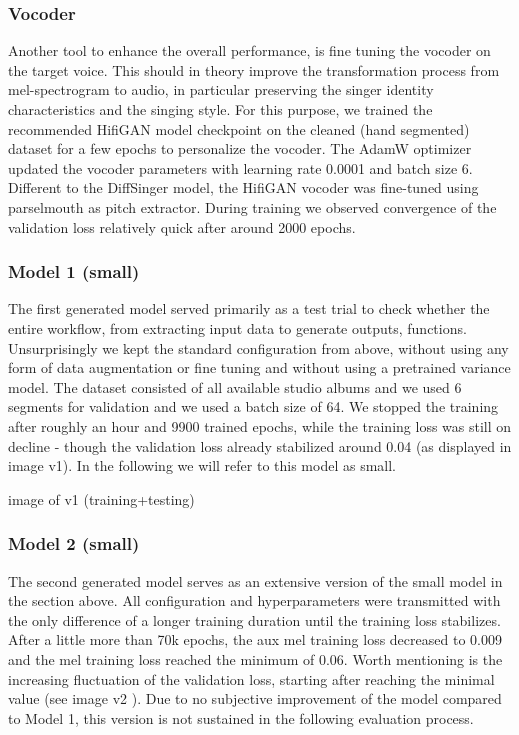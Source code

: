 \documentclass[a4paper]{article}
\begin{document}
	\subsubsection{Vocoder}
	
	Another tool to enhance the overall performance, is fine tuning the vocoder on the target voice. This should in theory improve the transformation process from mel-spectrogram to audio, in particular preserving the singer identity characteristics and the singing style. For this purpose, we trained the recommended HifiGAN model checkpoint on the cleaned (hand segmented) dataset for a few epochs to personalize the vocoder. The AdamW optimizer updated the vocoder parameters with learning rate 0.0001 and batch size 6. Different to the DiffSinger model, the HifiGAN vocoder was fine-tuned using parselmouth as pitch extractor. During training we observed convergence of the validation loss relatively quick after around 2000 epochs. 
	
	\subsubsection{Model 1 (small)}
	
	The first generated model served primarily as a test trial to check whether the entire workflow, from extracting input data to generate outputs, functions. Unsurprisingly we kept the standard configuration from above, without using any form of data augmentation or fine tuning and without using a pretrained variance model. The dataset consisted of all available studio albums and we used 6 segments for validation and we used a batch size of 64. We stopped the training after roughly an hour and 9900 trained epochs, while the training loss was still on decline - though the validation loss already stabilized around 0.04 (as displayed in image \color{red}v1\color{black}). In the following we will refer to this model as small.
	
	\color{red}image of v1 (training+testing)\color{black}
	
	\subsubsection{Model 2 (small)}
	
	The second generated model serves as an extensive version of the small model in the section above. All configuration and hyperparameters were transmitted with the only difference of a longer training duration until the training loss stabilizes. After a little more than 70k epochs, the aux mel training loss decreased to 0.009 and the mel training loss reached the minimum of 0.06. Worth mentioning is the increasing fluctuation of the validation loss, starting after reaching the minimal value (see image \color{red}v2\color{black} ). Due to no subjective improvement of the model compared to Model 1, this version is not sustained in the following evaluation process. 
	
\end{document}
